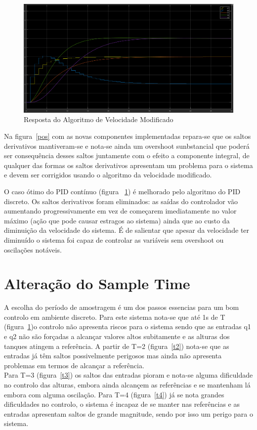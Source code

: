 \documentclass[11pt]{article}
\begin{document}
\begin{figure}[!htbp]
	\centering
      		 \includegraphics[page=1,width=1\textwidth]{img/full.png} 
		\caption{Resposta do Algoritmo de Velocidade Modificado}	
	\label{vel}
\end{figure}
Na figura~\ref{pos} com as novas componentes implementadas repara-se que os saltos derivativos mantiveram-se e nota-se ainda um overshoot sunbstancial que poderá ser consequência desses saltos juntamente com o efeito a componente integral, de qualquer das formas os saltos derivativos apresentam um problema para o sistema e devem ser corrigidos usando o algoritmo da velocidade modificado.

O caso ótimo do PID contínuo (figura ~\ref{vel}) é melhorado pelo algoritmo do PID discreto. Os saltos derivativos foram eliminados: as saídas do controlador vão aumentando progressivamente em vez de começarem imediatamente no valor máximo (ação que pode causar estragos ao sistema) ainda que ao custo da diminuição da velocidade do sistema. É de salientar que apesar da velocidade ter diminuído o sistema foi capaz de controlar as variáveis sem overshoot ou oscilações notáveis.

\section{Alteração do Sample Time}
A escolha do período de amostragem é um dos passos essencias para um bom controlo em ambiente discreto. Para este sistema nota-se que até 1s de T (figura~\ref{vel})o controlo não apresenta riscos para o sistema sendo que as entradas q1 e q2 não são forçadas a alcançar valores altos subitamente e as alturas dos tanques atingem a referência. A partir de T=2 (figura~\ref{t2}) nota-se que as entradas já têm saltos possivelmente perigosos mas ainda não apresenta problemas em termos de alcançar a referência.\\
Para T=3 (figura~\ref{t3}) os saltos das entradas pioram e nota-se alguma dificuldade no controlo das alturas, embora ainda alcançem as referências e se mantenham lá embora com alguma oscilação.
Para T=4 (figura~\ref{t4}) já se nota grandes dificuldades no controlo, o sistema é incapaz de se manter nas referências e as entradas apresentam saltos de grande magnitude, sendo por isso um perigo para o sistema.
\end{document}
